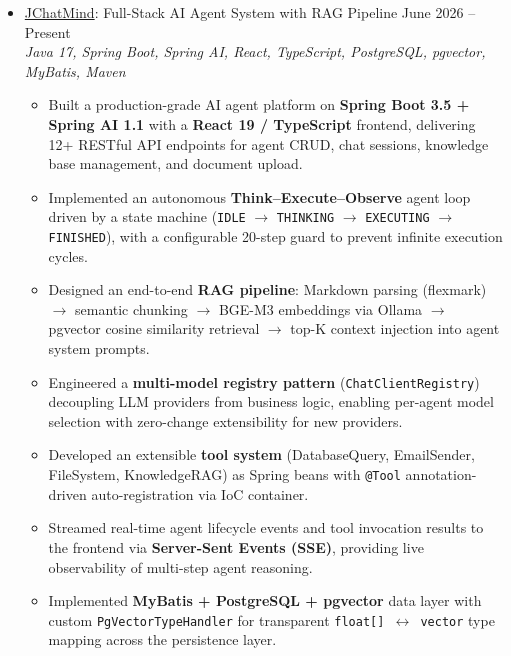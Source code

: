 \documentclass[letterpaper,11pt]{article}
\begin{document}
\begin{itemize}[leftmargin=0.15in, label={}]
    \item{
        \href{https://github.com/8Dis-like/JChatMind}{JChatMind}: Full-Stack AI Agent System with RAG Pipeline \hfill June 2026 -- Present \\ \emph{Java 17, Spring Boot, Spring AI, React, TypeScript, PostgreSQL, pgvector, MyBatis, Maven}
        \begin{itemize}[leftmargin=0.25in, label={$\bullet$}]
            \item Built a production-grade AI agent platform on \textbf{Spring Boot 3.5 + Spring AI 1.1} with a \textbf{React 19 / TypeScript} frontend, delivering 12+ RESTful API endpoints for agent CRUD, chat sessions, knowledge base management, and document upload.
            \item Implemented an autonomous \textbf{Think--Execute--Observe} agent loop driven by a state machine (\texttt{IDLE} $\to$ \texttt{THINKING} $\to$ \texttt{EXECUTING} $\to$ \texttt{FINISHED}), with a configurable 20-step guard to prevent infinite execution cycles.
            \item Designed an end-to-end \textbf{RAG pipeline}: Markdown parsing (flexmark) $\to$ semantic chunking $\to$ BGE-M3 embeddings via Ollama $\to$ pgvector cosine similarity retrieval $\to$ top-K context injection into agent system prompts.
            \item Engineered a \textbf{multi-model registry pattern} (\texttt{ChatClientRegistry}) decoupling LLM providers from business logic, enabling per-agent model selection with zero-change extensibility for new providers.
            \item Developed an extensible \textbf{tool system} (DatabaseQuery, EmailSender, FileSystem, KnowledgeRAG) as Spring beans with \texttt{@Tool} annotation-driven auto-registration via IoC container.
            \item Streamed real-time agent lifecycle events and tool invocation results to the frontend via \textbf{Server-Sent Events (SSE)}, providing live observability of multi-step agent reasoning.
            \item Implemented \textbf{MyBatis + PostgreSQL + pgvector} data layer with custom \texttt{PgVectorTypeHandler} for transparent \texttt{float[] $\leftrightarrow$ vector} type mapping across the persistence layer.
        \end{itemize}
    }


\end{itemize}
\end{document}
